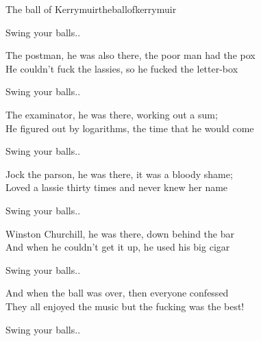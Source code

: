 \begin{song}{The ball of Kerrymuir}{theballofkerrymuir}
\begin{vers}
\end{vers}
\begin{vers}
Swing your balls..\\
\end{vers}
\begin{vers}
The postman, he was also there, the poor man had the pox\\
He couldn't fuck the lassies, so he fucked the letter-box\\
\end{vers}
\begin{vers}
Swing your balls..\\
\end{vers}
\begin{vers}
The examinator, he was there, working out a sum;\\
He figured out by logarithms, the time that he would come\\
\end{vers}
\begin{vers}
Swing your balls..\\
\end{vers}
\begin{vers}
Jock the parson, he was there, it was a bloody shame;\\
Loved a lassie thirty times and never knew her name\\
\end{vers}
\begin{vers}
Swing your balls..\\
\end{vers}
\begin{vers}
Winston Churchill, he was there, down behind the bar\\
And when he couldn't get it up, he used his big cigar\\
\end{vers}
\begin{vers}
Swing your balls..\\
\end{vers}
\begin{vers}
And when the ball was over, then everyone confessed\\
They all enjoyed the music but the fucking was the best!\\
\end{vers}
\begin{vers}
Swing your balls..\\
\end{vers}
\end{song}
